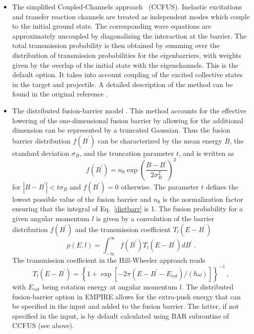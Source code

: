 \begin{itemize}
\item The simplified Coupled-Channels approach~\cite{CCFUS} (CCFUS).
Inelastic excitations and transfer reaction channels are treated as
independent modes which couple to the initial ground state. The
corresponding wave equations are approximately uncoupled by diagonalizing
the interaction at the barrier. The total transmission probability is then
obtained by summing over the distribution of transmission probabilities for
the eigenbarriers, with weights given by the overlap of the initial state
with the eigenchannels. This is the default option. It takes into account
coupling of the excited collective states in the target and projectile. A
detailed description of the method can be found in the original reference
\cite{CCFUS}.

\item The distributed fusion-barrier%
 model \cite{difusb}. This method accounts
for the effective lowering of the one-dimensional fusion barrier by allowing
for the additional dimension can be represented by a truncated Gaussian.
Thus the fusion barrier distribution $f(B^{\prime})$ can be characterized by
the mean energy $B$, the standard deviation $\sigma_{B}$, and the truncation
parameter $t$, and is written as
\begin{equation}
f(B^{\prime})=n_{0}\exp\left(%
\frac{B-B^{\prime}}{2\sigma_{B}^{2}}\right)^{2}  \label{distbarr}
\end{equation}
\noindent for $\left|B-B^{\prime}\right|<t\sigma_{B}$ and $f(B^{\prime})=0$
otherwise. The parameter $t$ defines the lowest possible value of the fusion
barrier and $n_{0}$ is the normalization factor ensuring that the integral
of Eq.~\ref{distbarr} is 1. The fusion probability for a given angular
momentum $l$ is given by a convolution of the barrier distribution $%
f(B^{\prime})$ and the transmission coefficient $T_{l}(E-B^{\prime})$
\begin{equation}
p(E,l)=\int_{-\infty}^{\infty}f(B^{\prime})T_{l}(E-B^{\prime})dB^{\prime}\,.
\end{equation}
\noindent The transmission coefficient in the Hill-Wheeler approach \cite%
{HillWheeler} reads
\begin{equation}
T_{l}(E-B^{\prime})=\left\{ 1+\exp\left[-2\pi(E-B^{\prime}-E_{rot})/(\hbar%
\omega)\right]\right\} ^{-1}\,,
\end{equation}
\noindent with $E_{rot}$ being rotation energy at angular momentum $l$. The
distributed fusion-barrier option in EMPIRE allows for the extra-push energy
that can be specified in the input and added to the fusion barrier. The
latter, if not specified in the input, is by default calculated using BAR
subroutine of CCFUS (see above).


\end{itemize}
